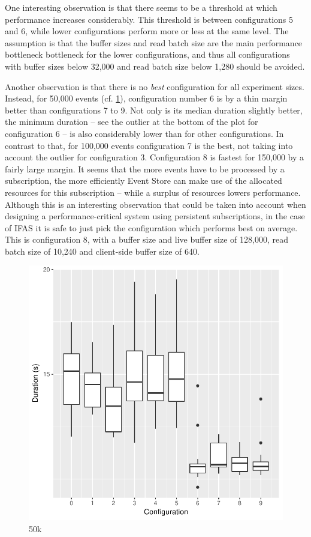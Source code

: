One interesting observation is that there seems to be a threshold at which performance increases considerably.
This threshold is between configurations 5 and 6, while lower configurations perform more or less at the same level.
The assumption is that the buffer sizes and read batch size are the main performance bottleneck bottleneck for the lower configurations, and thus all configurations with buffer sizes below 32,000 and read batch size below 1,280 should be avoided.

Another observation is that there is no \emph{best} configuration for all experiment sizes.
Instead, for 50,000 events (cf. \ref{fig:evaluation:performance:mean-durations-50k}), configuration number 6 is by a thin margin better than configurations 7 to 9.
Not only is its median duration slightly better, the minimum duration -- see the outlier at the bottom of the plot for configuration 6 -- is also considerably lower than for other configurations.
In contrast to that, for 100,000 events configuration 7 is the best, not taking into account the outlier for configuration 3.
Configuration 8 is fastest for 150,000 by a fairly large margin.
It seems that the more events have to be processed by a subscription, the more efficiently Event Store can make use of the allocated resources for this subscription -- while a surplus of resources lowers performance.
Although this is an interesting observation that could be taken into account when designing a performance-critical system using persistent subscriptions, in the case of \ac{IFAS} it is safe to just pick the configuration which performs best on average.
This is configuration 8, with a buffer size and live buffer size of 128,000, read batch size of 10,240 and client-side buffer size of 640.

\begin{figure}[htb]
        \includegraphics[width=\textwidth,keepaspectratio]{gfx/mean-durations-50k.pdf}
        \caption{50k}
        \label{fig:evaluation:performance:mean-durations-50k}
\end{figure}


